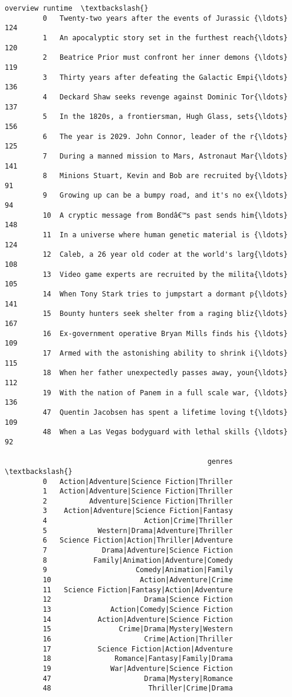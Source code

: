 \documentclass[11pt]{article}
\begin{document}
\begin{Verbatim}[commandchars=\\\{\}]
                                                      overview runtime  \textbackslash{}
         0   Twenty-two years after the events of Jurassic {\ldots}     124   
         1   An apocalyptic story set in the furthest reach{\ldots}     120   
         2   Beatrice Prior must confront her inner demons {\ldots}     119   
         3   Thirty years after defeating the Galactic Empi{\ldots}     136   
         4   Deckard Shaw seeks revenge against Dominic Tor{\ldots}     137   
         5   In the 1820s, a frontiersman, Hugh Glass, sets{\ldots}     156   
         6   The year is 2029. John Connor, leader of the r{\ldots}     125   
         7   During a manned mission to Mars, Astronaut Mar{\ldots}     141   
         8   Minions Stuart, Kevin and Bob are recruited by{\ldots}      91   
         9   Growing up can be a bumpy road, and it's no ex{\ldots}      94   
         10  A cryptic message from Bondâ€™s past sends him{\ldots}     148   
         11  In a universe where human genetic material is {\ldots}     124   
         12  Caleb, a 26 year old coder at the world's larg{\ldots}     108   
         13  Video game experts are recruited by the milita{\ldots}     105   
         14  When Tony Stark tries to jumpstart a dormant p{\ldots}     141   
         15  Bounty hunters seek shelter from a raging bliz{\ldots}     167   
         16  Ex-government operative Bryan Mills finds his {\ldots}     109   
         17  Armed with the astonishing ability to shrink i{\ldots}     115   
         18  When her father unexpectedly passes away, youn{\ldots}     112   
         19  With the nation of Panem in a full scale war, {\ldots}     136   
         47  Quentin Jacobsen has spent a lifetime loving t{\ldots}     109   
         48  When a Las Vegas bodyguard with lethal skills {\ldots}      92   
         
                                                genres  \textbackslash{}
         0   Action|Adventure|Science Fiction|Thriller   
         1   Action|Adventure|Science Fiction|Thriller   
         2          Adventure|Science Fiction|Thriller   
         3    Action|Adventure|Science Fiction|Fantasy   
         4                       Action|Crime|Thriller   
         5            Western|Drama|Adventure|Thriller   
         6   Science Fiction|Action|Thriller|Adventure   
         7             Drama|Adventure|Science Fiction   
         8           Family|Animation|Adventure|Comedy   
         9                     Comedy|Animation|Family   
         10                     Action|Adventure|Crime   
         11   Science Fiction|Fantasy|Action|Adventure   
         12                      Drama|Science Fiction   
         13              Action|Comedy|Science Fiction   
         14           Action|Adventure|Science Fiction   
         15                Crime|Drama|Mystery|Western   
         16                      Crime|Action|Thriller   
         17           Science Fiction|Action|Adventure   
         18               Romance|Fantasy|Family|Drama   
         19              War|Adventure|Science Fiction   
         47                      Drama|Mystery|Romance   
         48                       Thriller|Crime|Drama   
         

\end{Verbatim}
\end{document}
